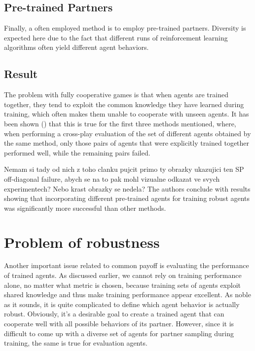 \subsection{Pre-trained Partners}
Finally, a often employed method is to employ pre-trained partners.
Diversity is expected here due to the fact that different runs of reinforcement learning algorithms often yield different agent behaviors.


\subsection{Result}\label{offDiagonalReport}
The problem with fully cooperative games is that when agents are trained together, they tend to exploit the common knowledge they have learned during training, which often makes them unable to cooperate with unseen agents.
It has been shown (\cite{10.1007/978-3-030-63823-8_46}) that this is true for the first three methods mentioned, 
where, when performing a cross-play evaluation of the set of different agents obtained by the same method, 
only those pairs of agents that were explicitly trained together performed well, while the remaining pairs failed.

{\color{blue} Nemam si tady od nich z toho clanku pujcit primo ty obrazky ukazujici ten SP off-diagonal failure, abych se na to pak mohl vizualne odkazat ve svych experimentech? 
Nebo krast obrazky se nedela?}
The authors conclude with results showing that incorporating different pre-trained agents for training robust agents was significantly more successful than other methods.


\section{Problem of robustness}\label{RobustnessEvaluation}
Another important issue related to common payoff is evaluating the performance of trained agents.
As discussed earlier, we cannot rely on training performance alone, no matter what metric is chosen, because training sets of agents exploit shared knowledge and thus make training performance appear excellent.
As noble as it sounds, it is quite complicated to define which agent behavior is actually robust.
Obviously, it's a desirable goal to create a trained agent that can cooperate well with all possible behaviors of its partner.
However, since it is difficult to come up with a diverse set of agents for partner sampling during training, the same is true for evaluation agents.

